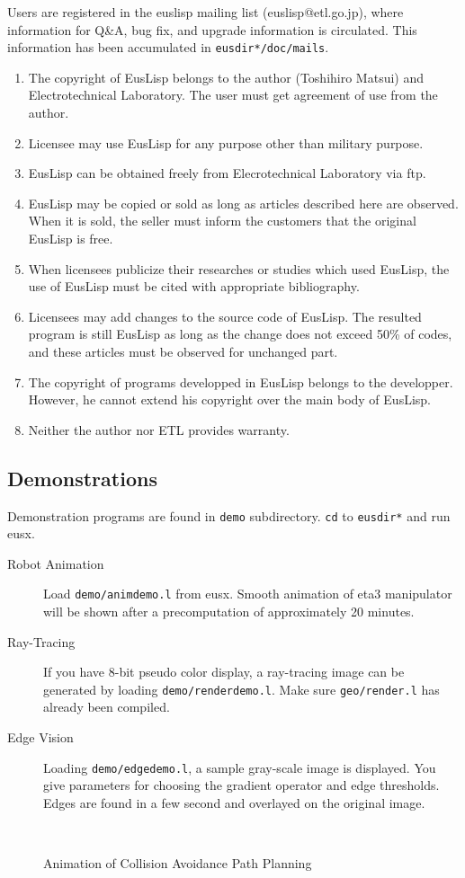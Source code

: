 Users are registered in the euslisp mailing list (euslisp@etl.go.jp),
where information for Q\&A, bug fix, and upgrade information is circulated.
This information has been accumulated in {\tt *eusdir*/doc/mails}.

\begin{enumerate}
\item The copyright of EusLisp belongs to
the author (Toshihiro Matsui) and Electrotechnical Laboratory.
The user must get agreement of use from the author.
\item Licensee may use EusLisp for any purpose other than military purpose.
\item EusLisp can be obtained freely from Elecrotechnical Laboratory
via ftp.
\item EusLisp may be copied or sold as long as articles described here
are observed. When it is sold, the seller must inform the customers
that the original EusLisp is free.
\item When licensees publicize their researches or studies which used EusLisp,
the use of EusLisp must be cited with appropriate bibliography.
\item Licensees may add changes to the source code of EusLisp.
The resulted program is still EusLisp as long as the
change does not exceed 50\% of codes,
and these articles must be observed for unchanged part.
\item The copyright of programs developped in EusLisp belongs to the
developper. However, he cannot extend his copyright over the main body
of EusLisp.
\item Neither the author nor ETL provides warranty.
\end{enumerate}

\subsection{Demonstrations}
Demonstration programs are found in {\tt demo} subdirectory.
{\tt cd} to {\tt *eusdir*} and run eusx.
\begin{description}
\item[Robot Animation] 
Load {\tt demo/animdemo.l} from eusx.
Smooth animation of eta3 manipulator will be shown after a
precomputation of approximately 20 minutes.
\item[Ray-Tracing] 
If you have 8-bit pseudo color display,
a ray-tracing image can be generated by loading
{\tt demo/renderdemo.l}.
Make sure {\tt geo/render.l} has already been compiled.
\item[Edge Vision]
Loading {\tt demo/edgedemo.l}, a sample gray-scale image is displayed.
You give parameters for choosing the gradient operator and 
edge thresholds.
Edges are found in a few second and overlayed on the original image.
\end{description}

\begin{figure}
\mbox{
\epsfxsize=15cm
}
\caption{Animation of Collision Avoidance Path Planning}
\end{figure}



\newpage
